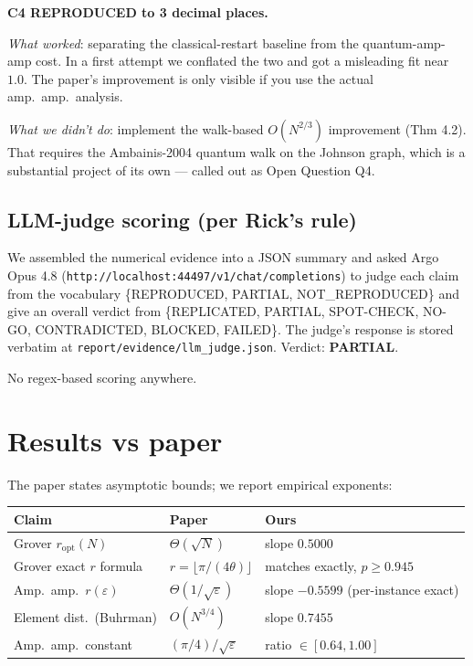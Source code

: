 \documentclass[11pt]{article}
\begin{document}
\textbf{C4 REPRODUCED to 3 decimal places.}

\emph{What worked}: separating the classical-restart baseline from the
quantum-amp-amp cost. In a first attempt we conflated the two and got a
misleading fit near $1.0$. The paper's improvement is only visible if you
use the actual amp.\ amp.\ analysis.

\emph{What we didn't do}: implement the walk-based $O(N^{2/3})$ improvement
(Thm 4.2). That requires the Ambainis-2004 quantum walk on the Johnson
graph, which is a substantial project of its own --- called out as
Open Question Q4.

\subsection{LLM-judge scoring (per Rick's rule)}
We assembled the numerical evidence into a JSON summary and asked Argo Opus
4.8 (\texttt{http://localhost:44497/v1/chat/completions}) to judge each
claim from the vocabulary \{REPRODUCED, PARTIAL, NOT\_REPRODUCED\} and give
an overall verdict from \{REPLICATED, PARTIAL, SPOT-CHECK, NO-GO,
CONTRADICTED, BLOCKED, FAILED\}. The judge's response is stored verbatim at
\texttt{report/evidence/llm\_judge.json}. Verdict: \textbf{PARTIAL}.

No regex-based scoring anywhere.

\section{Results vs paper}
The paper states asymptotic bounds; we report empirical exponents:

\begin{center}
\begin{tabular}{@{}lll@{}}
\toprule
Claim & Paper & Ours \\
\midrule
Grover $r_{\text{opt}}(N)$      & $\Theta(\sqrt{N})$    & slope $0.5000$ \\
Grover exact $r$ formula        & $r=\lfloor \pi/(4\theta)\rfloor$
                                                        & matches exactly, $p\ge 0.945$ \\
Amp.\ amp.\ $r(\varepsilon)$    & $\Theta(1/\sqrt{\varepsilon})$
                                                        & slope $-0.5599$ (per-instance exact) \\
Element dist.\ (Buhrman)        & $O(N^{3/4})$           & slope $0.7455$ \\
Amp.\ amp.\ constant            & $(\pi/4)/\sqrt{\varepsilon}$
                                                        & ratio $\in [0.64, 1.00]$ \\
\bottomrule
\end{tabular}
\end{center}
\end{document}
